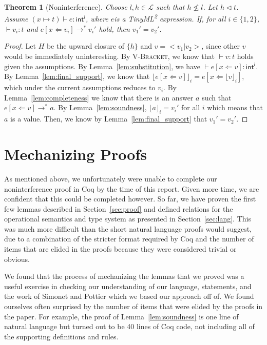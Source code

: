 \documentclass[a4paper,twocolumn]{article}
\newcommand{\langName}[0]{TinyML\textsuperscript{2}}
\newcommand{\typeRule}[3]{#1 \vdash #2 \colon #3}
\newcommand{\guards}[0]{\lhd}
\newcommand{\lift}[1]{\lfloor #1 \rfloor}
\theoremstyle{plain}
\newtheorem{thm}{Theorem}
\theoremstyle{definition}
\begin{document}
\begin{thm}[Noninterference]
  Choose $l, h \in \mathcal{L}$ such that $h \not\leq l$.  Let $h \guards t$.
  Assume $\typeRule{(x \mapsto t)}{e}{\textsf{int}^l}$, where $e$is a \langName
  expression.  If, for all $i \in \{1, 2\}$, $\typeRule{ }{v_i}{t}$ and $e[x
  \Leftarrow v_i] \to^* v_i'$ hold, then $v_1' = v_2'$.
\end{thm}
\begin{proof}
  Let $H$ be the upward closure of $\{h\}$ and $v = < v_1 | v_2 >$, since other
  $v$ would be immediately uninteresting.  By \textsc{V-Bracket}, we know that
  $\typeRule{ }{v}{t}$ holds given the assumptions.
  By Lemma~\ref{lem:substitution}, we have $\typeRule{ }{e[x \Leftarrow
  v]}{\textsf{int}^l}$.  By Lemma~\ref{lem:final_support}, we know that
  $\lift{e[x \Leftarrow v]}_i = e[x \Leftarrow \lift{v}_i]$, which under the
  current assumptions reduces to $v_i$.  By Lemma~\ref{lem:completeness} we know
  that there is an answer $a$ such that $e[x \Leftarrow v] \to^* a$.  By
  Lemma~\ref{lem:soundness}, $\lift{a}_i = v_i'$ for all $i$ which means that
  $a$ is a value.  Then, we know by Lemma~\ref{lem:final_support} that $v_1' =
  v_2'$.
\end{proof}

\section{Mechanizing Proofs}
\label{sec:mechanizing}

As mentioned above, we unfortunately were unable to complete our noninterference
proof in Coq by the time of this report.  Given more time, we are confident that
this could be completed however.  So far, we have proven the first few lemmas
described in Section~\ref{sec:proof} and defined relations for the operational
semantics and type system as presented in Section~\ref{sec:lang}.  This was much
more difficult than the short natural language proofs would suggest, due to a
combination of the stricter format required by Coq and the number of items that
are elided in the proofs because they were considered trivial or obvious.

We found that the process of mechanizing the lemmas that we proved was a useful
exercise in checking our understanding of our language, statements, and the work
of Simonet and Pottier which we based our approach off of.  We found ourselves
often surprised by the number of items that were elided by the proofs in the
paper.  For example, the proof of Lemma~\ref{lem:soundness} is one line of
natural language but turned out to be 40 lines of Coq code, not including all of
the supporting definitions and rules.
\end{document}
